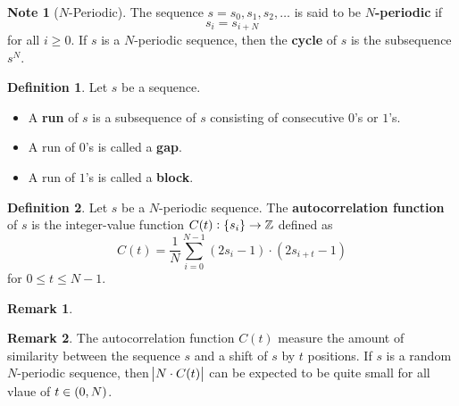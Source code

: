 \documentclass[12pt,openany]{book}
\theoremstyle{definition}
\newtheorem{definition}{Definition}[chapter]
\newtheorem{remark}{Remark}[chapter]
\newtheorem*{note}{Note}
\newcommand{\Z}{\mathbb{Z}}
\begin{document}
	\begin{note}[$N$-Periodic]
		The sequence $s=s_0,s_1,s_2,\dots$ is said to be \textbf{$N$-periodic} if \[
		s_i=s_{i+N}
		\] for all $i\geq 0$. If $s$ is a $N$-periodic sequence, then the \textbf{cycle} of $s$ is the subsequence $s^N$.
	\end{note}
	\vspace{12pt}
	\begin{tcolorbox}[colback=white,colframe=defcolor,arc=5pt,title={\color{white}\bf Run - Gap / Block}]
		\begin{definition}
			Let $s$ be a sequence. \begin{itemize}
				\item A \textbf{run} of $s$ is a subsequence of $s$ consisting of consecutive $0$'s or $1$'s.
				\item A run of $0$'s is called a \textbf{gap}.
				\item A run of $1$'s is called a \textbf{block}.
			\end{itemize}
		\end{definition}
	\end{tcolorbox}
	\vspace{24pt}
	\begin{tcolorbox}[colback=white,colframe=defcolor,arc=5pt,title={\color{white}\bf Autocorrelation Function}]
		\begin{definition}
			Let $s$ be a $N$-periodic sequence. The \textbf{autocorrelation function} of $s$ is the integer-value function $C(t):\set{s_i}\to\Z$ defined as \[
			C(t) = \frac{1}{N}\sum_{i=0}^{N-1}(2s_i - 1) \cdot (2s_{i+t} - 1)
			\] for $0\leq t\leq N-1$.
		\end{definition}
	\end{tcolorbox}
	\begin{remark}
		
	\end{remark}
	\begin{remark}
		The autocorrelation function $C(t)$ measure the amount of similarity between the sequence $s$ and a shift of $s$ by $t$ positions. If $s$ is a random $N$-periodic sequence, then $\abs{N\cdot C(t)}$ can be expected to be quite small for all vlaue of $t\in\intoo{0,N}$. 
	\end{remark}
\end{document}
